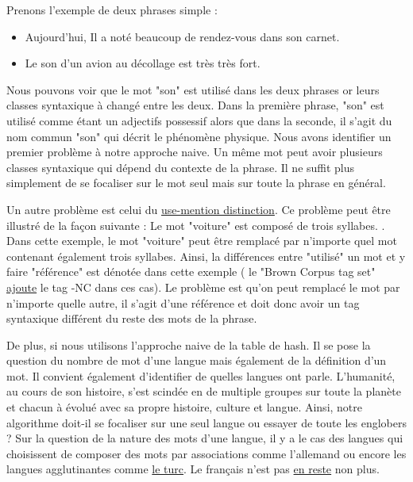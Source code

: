 \documentclass[french, 14pt]{memoir}
\begin{document}
Prenons l'exemple de deux phrases simple :
\begin{itemize}
    \item Aujourd'hui, Il a noté beaucoup de rendez-vous dans son carnet.
    \item Le son d'un avion au décollage est très très fort.
\end{itemize}

Nous pouvons voir que le mot "son" est utilisé dans les deux phrases or leurs classes syntaxique à changé entre les deux. Dans la première phrase, "son" est utilisé comme étant un adjectifs possessif alors que dans la seconde, il s'agit du nom commun "son" qui décrit le phénomène physique. Nous avons identifier un premier problème à notre approche naive. Un même mot peut avoir plusieurs classes syntaxique qui dépend du contexte de la phrase. Il ne suffit plus simplement de se focaliser sur le mot seul mais sur toute la phrase en général.

Un autre problème est celui du \href{https://en.wikipedia.org/wiki/Use\%E2\%80\%93mention_distinction}{use-mention distinction}. Ce problème peut être illustré de la façon suivante : Le mot "voiture" est composé de trois syllabes. . Dans cette exemple, le mot "voiture" peut être remplacé par n'importe quel mot contenant également trois syllabes. Ainsi, la différences entre "utilisé" un mot et y faire "référence" est dénotée dans cette exemple ( le "Brown Corpus tag set" \href{https://en.wikipedia.org/wiki/Part-of-speech_tagging#Issues}{ajoute} le tag -NC dans ces cas). Le problème est qu'on peut remplacé le mot par n'importe quelle autre, il s'agit d'une référence et doit donc avoir un tag syntaxique différent du reste des mots de la phrase.

De plus, si nous utilisons l'approche naive de la table de hash. Il se pose la question du nombre de mot d'une langue mais également de la définition d'un mot. Il convient également d'identifier de quelles langues ont parle. L'humanité, au cours de son histoire, s'est scindée en de multiple groupes sur toute la planète et chacun à évolué avec sa propre histoire, culture et langue. Ainsi, notre algorithme doit-il se focaliser sur une seul langue ou essayer de toute les englobers ? Sur la question de la nature des mots d'une langue, il y a le cas des langues qui choisissent de composer des mots par associations comme l'allemand ou encore les langues agglutinantes comme \href{https://en.wikipedia.org/wiki/Longest_word_in_Turkish}{le turc}. Le français n'est pas \href{https://en.wikipedia.org/wiki/Longest_word_in_French}{en reste} non plus.
\end{document}
